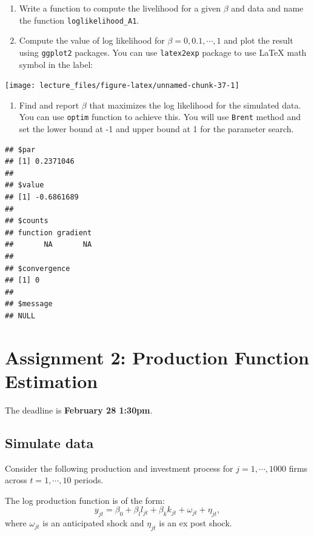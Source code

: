 \documentclass[]{book}
\providecommand{\tightlist}{%
  \setlength{\itemsep}{0pt}\setlength{\parskip}{0pt}}
\begin{document}
\begin{enumerate}
\def\labelenumi{\arabic{enumi}.}
\item
  Write a function to compute the livelihood for a given \(\beta\) and
  data and name the function \texttt{loglikelihood\_A1}.
\item
  Compute the value of log likelihood for \(\beta = 0, 0.1, \cdots, 1\)
  and plot the result using \texttt{ggplot2} packages. You can use
  \texttt{latex2exp} package to use LaTeX math symbol in the label:
\end{enumerate}

\begin{center}\texttt{[image: lecture\_files/figure-latex/unnamed-chunk-37-1]} \end{center}

\begin{enumerate}
\def\labelenumi{\arabic{enumi}.}
\tightlist
\item
  Find and report \(\beta\) that maximizes the log likelihood for the
  simulated data. You can use \texttt{optim} function to achieve this.
  You will use \texttt{Brent} method and set the lower bound at -1 and
  upper bound at 1 for the parameter search.
\end{enumerate}

\begin{verbatim}
## $par
## [1] 0.2371046
## 
## $value
## [1] -0.6861689
## 
## $counts
## function gradient 
##       NA       NA 
## 
## $convergence
## [1] 0
## 
## $message
## NULL
\end{verbatim}

\chapter{Assignment 2: Production Function
Estimation}\label{assignment2}

The deadline is \textbf{February 28 1:30pm}.

\section{Simulate data}\label{simulate-data-1}

Consider the following production and investment process for
\(j = 1, \cdots, 1000\) firms across \(t = 1, \cdots, 10\) periods.

The log production function is of the form: \[
y_{jt} = \beta_0 + \beta_l l_{jt} + \beta_k k_{jt} + \omega_{jt} + \eta_{jt},
\] where \(\omega_{jt}\) is an anticipated shock and \(\eta_{jt}\) is an
ex post shock.
\end{document}
